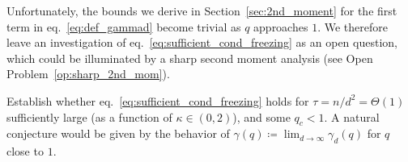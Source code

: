 Unfortunately, the bounds we derive in Section~\ref{sec:2nd_moment} for the first term in eq.~\eqref{eq:def_gammad} become trivial as $q$ approaches $1$. 
We therefore leave an investigation of eq.~\eqref{eq:sufficient_cond_freezing} as an open question, which could be illuminated by a sharp second moment analysis (see Open Problem~\ref{op:sharp_2nd_mom}).
\begin{openquestion}[Second moment potential close to $q = 1$]
    Establish whether eq.~\eqref{eq:sufficient_cond_freezing} holds for $\tau = n /d^2 = \Theta(1)$ sufficiently large (as a function of $\kappa \in (0,2)$), and some $q_c < 1$.
    A natural conjecture would be given by the behavior of $\gamma(q) \coloneqq \lim_{d \to \infty} \gamma_d(q)$ for $q$ close to $1$.
\end{openquestion}